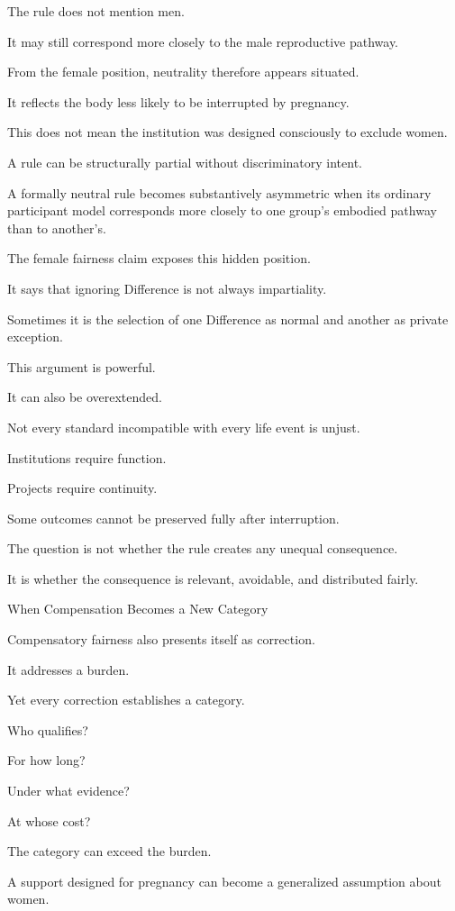 The rule does not mention men.

It may still correspond more closely to the male reproductive pathway.

From the female position, neutrality therefore appears situated.

It reflects the body less likely to be interrupted by pregnancy.

This does not mean the institution was designed consciously to exclude women.

A rule can be structurally partial without discriminatory intent.

A formally neutral rule becomes substantively asymmetric when its ordinary participant model corresponds more closely to one group’s embodied pathway than to another’s.

The female fairness claim exposes this hidden position.

It says that ignoring Difference is not always impartiality.

Sometimes it is the selection of one Difference as normal and another as private exception.

This argument is powerful.

It can also be overextended.

Not every standard incompatible with every life event is unjust.

Institutions require function.

Projects require continuity.

Some outcomes cannot be preserved fully after interruption.

The question is not whether the rule creates any unequal consequence.

It is whether the consequence is relevant, avoidable, and distributed fairly.

When Compensation Becomes a New Category

Compensatory fairness also presents itself as correction.

It addresses a burden.

Yet every correction establishes a category.

Who qualifies?

For how long?

Under what evidence?

At whose cost?

The category can exceed the burden.

A support designed for pregnancy can become a generalized assumption about women.

